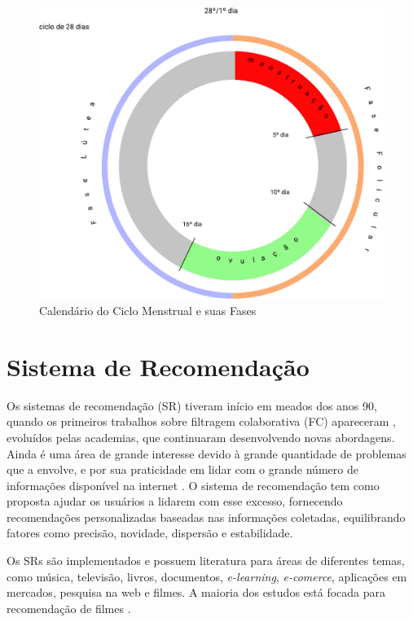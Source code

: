\begin{figure}[ht]
	\caption{Calendário do Ciclo Menstrual e suas Fases}
	\begin{center}
	\includegraphics[keepaspectratio=true,scale=0.4]{figuras/Group1.pdf}
	\end{center}
    \label{fig02}
\end{figure}

\section{Sistema de Recomendação}
\label{22}

Os sistemas de recomendação (SR) tiveram início em meados dos anos 90, 
quando os primeiros trabalhos sobre filtragem colaborativa (FC) 
apareceram \cite{felferning2008}, evoluídos pelas academias, 
que continuaram desenvolvendo novas abordagens. 
Ainda é uma área de grande interesse devido à grande quantidade de 
problemas que a envolve, e por sua praticidade em lidar com o grande 
número de informações disponível na internet \cite{adomavicius2005}. 
O sistema de recomendação tem como proposta ajudar os usuários a lidarem com esse 
excesso, fornecendo recomendações personalizadas baseadas nas informações 
coletadas, equilibrando fatores como precisão, novidade, dispersão e 
estabilidade\cite{bobadilla2013}.


Os SRs são implementados e possuem literatura 
para áreas de diferentes temas, como música, televisão, livros, 
documentos, \emph{e-learning}, \emph{e-comerce}, aplicações em mercados, 
pesquisa na web e filmes. A maioria dos estudos está focada 
para recomendação de filmes \cite{bobadilla2013}.
 

